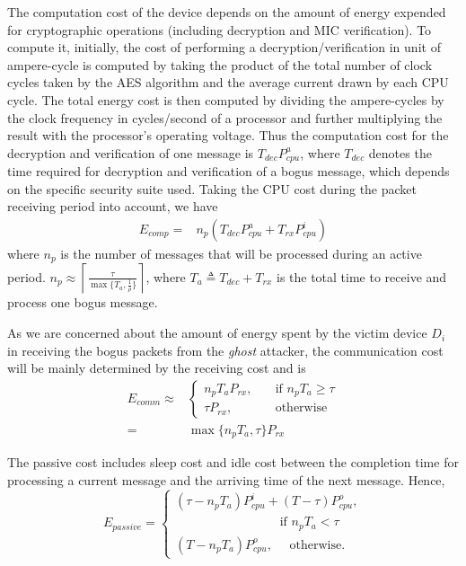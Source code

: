 \documentclass[10pt,journal,cspaper,compsoc]{IEEEtran}
\begin{document}
The computation cost of the device depends on the amount of energy expended for cryptographic operations (including decryption and MIC verification). To compute it, initially, the cost of performing a decryption/verification in unit of ampere-cycle is computed by taking the product of the total number of clock cycles taken by the AES algorithm and the average current drawn by each CPU cycle. The total energy cost is then computed by dividing the  ampere-cycles by the clock frequency in cycles/second of a processor and further multiplying the result with the processor's operating voltage. Thus the computation cost for the decryption and verification of one message is $T_{dec}P^a_{cpu}$, where $T_{dec}$ denotes the time required for decryption and verification of a bogus message, which depends on the specific security suite used. Taking the CPU cost during the packet receiving period into account, we have
\begin{align}
E_{comp} =& n_p\left(T_{dec}P^a_{cpu}+ T_{rx}P^i_{cpu}\right)
\end{align}
where $n_p$ is the number of messages that will be processed during an active period. $n_p\approx\left\lceil\frac{\tau}{\max\{T_a,\frac{1}{\rho}\}}\right\rceil$, where $T_a \triangleq T_{dec} + T_{rx}$ is the total time to receive and process one bogus message.


As we are concerned about the amount of energy spent by the victim device $D_i$ in receiving the bogus packets from the {\em ghost} attacker, the communication cost will be mainly determined by the receiving cost and is
\begin{align}
\nonumber E_{comm} \approx &  \left\{\begin{array}{ll}
        n_p T_{a} P_{rx}, \quad & \textrm{if } n_p T_{a}\geq \tau \\
        \tau P_{rx}, \quad & \textrm{otherwise}
    \end{array}\right.\\
         =& \max\{n_p T_{a},\tau\} P_{rx}
\end{align}

The passive cost includes sleep cost and idle cost between the completion time for processing a current message and the arriving time of the next message. Hence,
\begin{equation}
   E_{passive} = \left\{\begin{array}{l}
        (\tau-n_p T_a)P^i_{cpu} + (T-\tau)P^o_{cpu}, \\
            \qquad\qquad\qquad\qquad \text{ if } n_p T_a<\tau\\
        (T-n_p T_a)P^o_{cpu}, \quad\text{ otherwise}.
        \end{array}\right.
\end{equation}
\end{document}
